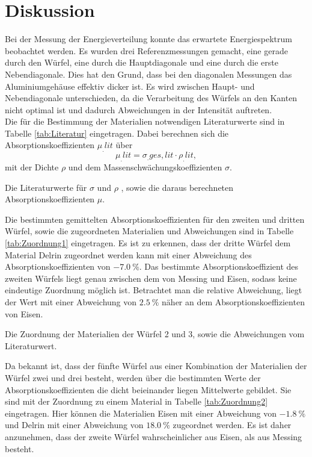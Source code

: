 
\section{Diskussion}
\label{sec:Diskussion}

Bei der Messung der Energieverteilung konnte das erwartete Energiespektrum beobachtet werden.
Es wurden drei Referenzmessungen gemacht, eine gerade durch den Würfel, eine durch die Hauptdiagonale und eine durch die erste Nebendiagonale. Dies hat den Grund, dass bei den diagonalen Messungen das Aluminiumgehäuse effektiv dicker ist. Es wird zwischen Haupt- und Nebendiagonale unterschieden, da die Verarbeitung des Würfels an den Kanten nicht optimal ist und dadurch Abweichungen in der Intensität auftreten.\\
\noindent Die für die Bestimmung der Materialien notwendigen Literaturwerte sind in Tabelle \ref{tab:Literatur} eingetragen.
Dabei berechnen sich die Absorptionskoeffizienten $\mu_.{lit}$ über
\[
\mu_.{lit} = \sigma_.{ges,lit}\cdot\rho_.{lit},
\]
mit der Dichte $\rho$ und dem Massenschwächungskoeffizienten $\sigma$.

\begin{table}
	\centering
	\caption{Die Literaturwerte für $\sigma$ \cite{absorptionskoeffizienten} und $\rho$ \cite{dichten}, sowie die daraus berechneten Absorptionskoeffizienten $\mu$.}
	
	\label{tab:Literatur}
\end{table}

\newpage
\noindent Die bestimmten gemittelten Absorptionskoeffizienten für den zweiten und dritten Würfel, sowie die zugeordneten Materialien und Abweichungen sind in Tabelle \ref{tab:Zuordnung1} eingetragen. Es ist zu erkennen, dass der dritte Würfel dem Material Delrin zugeordnet werden kann mit einer Abweichung des Absorptionskoeffizienten von $\SI{-7.0}{\%}$. Das bestimmte Absorptionskoeffizient des zweiten Würfels liegt genau zwischen dem von Messing und Eisen, sodass keine eindeutige Zuordnung möglich ist. Betrachtet man die relative Abweichung, liegt der Wert mit einer Abweichung von $\SI{2.5}{\%}$ näher an dem Absorptionskoeffizienten von Eisen.

\begin{table}
	\centering
	\caption{Die Zuordnung der Materialien der Würfel 2 und 3, sowie die Abweichungen vom Literaturwert.}
	
	\label{tab:Zuordnung1}
\end{table}

\noindent Da bekannt ist, dass der fünfte Würfel aus einer Kombination der Materialien der Würfel zwei und drei besteht, werden über die bestimmten Werte der Absorptionskoeffizienten die dicht beieinander liegen Mittelwerte gebildet. Sie sind mit der Zuordnung zu einem Material in Tabelle \ref{tab:Zuordnung2} eingetragen. Hier können die Materialien Eisen mit einer Abweichung von $\SI{-1.8}{\%}$ und Delrin mit einer Abweichung von $\SI{18.0}{\%}$ zugeordnet werden. Es ist daher anzunehmen, dass der zweite Würfel wahrscheinlicher aus Eisen, als aus Messing besteht. 

